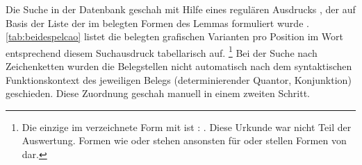 Die Suche in der Datenbank geschah
mit Hilfe
eines regulären Ausdrucks \autocite[dazu z.\,B.][33--37]{perkuhnetal2012}, der
auf Basis der Liste der im \CAO{} belegten Formen des Lemmas
 formuliert wurde \autocites(mit allen Deklinationsformen insgesamt
ca.~2.050 Belege)[vgl.][166--168]{wmu1}. \cref{tab:beidespelcao} listet die
belegten grafischen Varianten pro Position im Wort entsprechend diesem
Suchausdruck tabellarisch auf.%
%
	\footnote{Die einzige im \tit{\WMU{}} verzeichnete Form mit
		 ist  \autocite[166]{wmu1}: 
		 \autocites(Straßburg, 1294)[\pno~N~674,
		484.18]{cao5}. Diese Urkunde war nicht Teil der Auswertung. Formen wie
		 oder  stehen ansonsten für   oder stellen Formen von   dar.}
%
Bei der Suche nach Zeichenketten wurden die Belegstellen nicht automatisch nach
dem syntaktischen Funktionskontext des jeweiligen Belegs (determinierender
Quantor, Konjunktion) geschieden. Diese Zuordnung geschah manuell in einem
zweiten Schritt.


